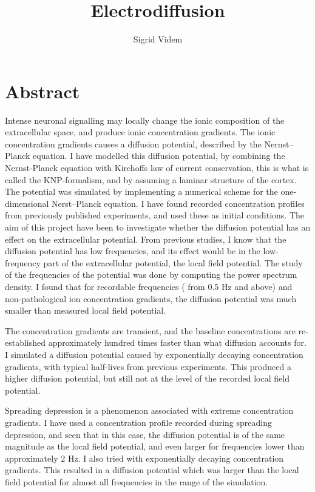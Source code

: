 \documentclass{article}
\author{Sigrid Videm}
\title{Electrodiffusion}
\begin{document}
\maketitle


\section{Abstract} 
Intense neuronal signalling may locally change the ionic composition of the extracellular space, and produce ionic concentration gradients. The ionic concentration gradients causes a diffusion potential, described by the Nernst--Planck equation. I have modelled this diffusion potential, by combining the Nernst-Planck equation with Kirchoffs law of current conservation, this is what is called the KNP-formalism, and by assuming a laminar structure of the cortex. The potential was simulated by implementing a numerical scheme for the one-dimensional Nerst--Planck equation. I have found recorded concentration profiles from previously published experiments, and used these as initial conditions. The aim of this project have been to investigate whether the diffusion potential has an effect on the extracellular potential. From previous studies, I know that the diffusion potential has low frequencies, and its effect would be in the low-frequency part of the extracellular potential, the local field potential. The study of the frequencies of the potential was done by computing the power spectrum density. I found that for recordable frequencies ( from 0.5 Hz and above) and non-pathological ion concentration gradients, the diffusion potential was much smaller than measured local field potential. 

The concentration gradients are transient, and the baseline concentrations are re-established approximately hundred times faster than what diffusion accounts for. I simulated a diffusion potential caused by exponentially decaying concentration gradients, with typical half-lives from previous experiments. This produced a higher diffusion potential, but still not at the level of the recorded local field potential. 

Spreading depression is a phenomenon associated with extreme concentration gradients. I have used a concentration profile recorded during spreading depression, and seen that in this case, the diffusion potential is of the same magnitude as the local field potential, and even larger for frequencies lower than approximately 2 Hz. I also tried with exponentially decaying concentration gradients. This resulted in a diffusion potential which was larger than the local field potential for almost all frequencies in the range of the simulation. 
\end{document}
